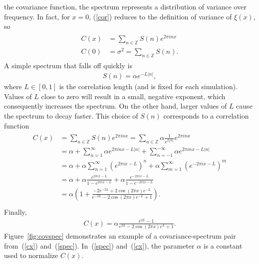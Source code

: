 the covariance function, the spectrum represents a distribution of variance over
frequency. In fact, for $x=0$, (\ref{cor}) reduces to the definition
of variance of $\xi(x)$, so 
\begin{align*}
\begin{split}
C(x) &= \sum_{n\in \mathbb{Z}}S(n)e^{2\pi inx}\\
C(0) &= \sigma^2 = \sum_{n\in \mathbb{Z}}S(n).
\end{split}
\end{align*}
A simple spectrum that falls off quickly is
\begin{align}\label{spec}
S(n)=\alpha e^{-L|n|},
\end{align}
where $L \in [0,1]$ is the correlation length (and is fixed
for each simulation). Values of $L$ close to zero will result in a
small, negative exponent, which consequently increases the
spectrum. On the other hand, larger values of $L$ cause
the spectrum to decay faster. This choice of $S(n)$ corresponds to a correlation function
\begin{align*}
\begin{split}
C(x) &= \sum_{n\in \mathbb{Z}}S(n)e^{2\pi inx}=\sum_{n\in \mathbb{Z}}\alpha \frac{1}{e^{L|n|}}e^{2\pi inx}\\
&= \alpha + \sum_{n=1}^{\infty}\alpha e^{2\pi
  inx-L|n|}+\sum_{n=-1}^{-\infty}\alpha e^{2\pi inx-L|n|}\\
&= \alpha+\alpha \sum_{n=1}^{\infty}(e^{2\pi ix-L})^n+\alpha \sum_{m=1}^{\infty}(e^{-2\pi ix-L})^m\\
&=\alpha + \alpha \frac{e^{2\pi ix-L}}{1-e^{2\pi ix-L}} +\alpha
\frac{e^{-2\pi ix-L}}{1-e^{-2\pi ix-L}}\\
&=\alpha \left(1+ \frac{-2e^{-2L}+2\cos(2\pi x)e^{-L}}{e^{-2L}-2\cos(2\pi x)e^{-L}+1} \right).\\
\end{split}
\end{align*}
Finally,
\begin{align}\label{cx}
C(x)= \alpha \frac{e^{2L}-1}{e^{2L}-2\cos(2\pi x)e^L+1}.
\end{align}
Figure~\ref{fig:covspec} demonstrates an example of a covariance-spectrum
pair from~(\ref{cx}) and~(\ref{spec}). In~(\ref{spec}) and~(\ref{cx}), the parameter $\alpha$ is a constant used to normalize
$C(x)$.
